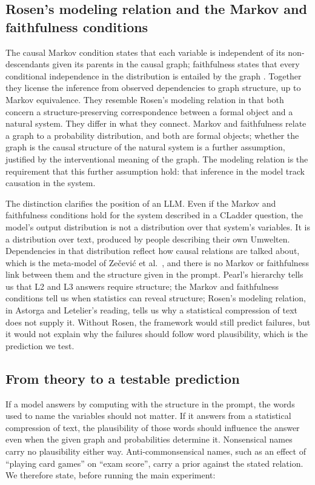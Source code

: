 \documentclass{llncs}
\begin{document}
\subsection{Rosen's modeling relation and the Markov and faithfulness conditions}
\label{sec:markov}

The causal Markov condition states that each variable is independent of its non-descendants given its parents in the causal graph; faithfulness states that every conditional independence in the distribution is entailed by the graph \cite{spirtes2000causation}. Together they license the inference from observed dependencies to graph structure, up to Markov equivalence. They resemble Rosen's modeling relation in that both concern a structure-preserving correspondence between a formal object and a natural system. They differ in what they connect. Markov and faithfulness relate a graph to a probability distribution, and both are formal objects; whether the graph is the causal structure of the natural system is a further assumption, justified by the interventional meaning of the graph. The modeling relation is the requirement that this further assumption hold: that inference in the model track causation in the system.

The distinction clarifies the position of an LLM. Even if the Markov and faithfulness conditions hold for the system described in a CLadder question, the model's output distribution is not a distribution over that system's variables. It is a distribution over text, produced by people describing their own Umwelten. Dependencies in that distribution reflect how causal relations are talked about, which is the meta-model of Zečević et al.\ \cite{Zecevic2023CausalPL}, and there is no Markov or faithfulness link between them and the structure given in the prompt. Pearl's hierarchy tells us that L2 and L3 answers require structure; the Markov and faithfulness conditions tell us when statistics can reveal structure; Rosen's modeling relation, in Astorga and Letelier's reading, tells us why a statistical compression of text does not supply it. Without Rosen, the framework would still predict failures, but it would not explain why the failures should follow word plausibility, which is the prediction we test.

\subsection{From theory to a testable prediction}
\label{sec:predictions}

If a model answers by computing with the structure in the prompt, the words used to name the variables should not matter. If it answers from a statistical compression of text, the plausibility of those words should influence the answer even when the given graph and probabilities determine it. Nonsensical names carry no plausibility either way. Anti-commonsensical names, such as an effect of ``playing card games'' on ``exam score'', carry a prior against the stated relation. We therefore state, before running the main experiment:
\end{document}
